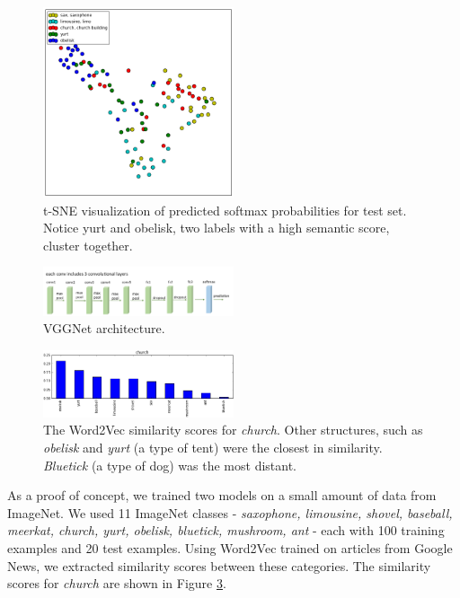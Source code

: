 \begin{figure}[!tb]
  \centering
  \includegraphics[width=0.5\textwidth]{figs/tsne.png}
  \caption{
      t-SNE visualization of predicted softmax probabilities for test set.
      Notice yurt and obelisk, two labels with a high semantic score, cluster
      together.
  }
  \label{fig:tsne}
\end{figure}

\begin{figure}[!tb]
  \centering
  \includegraphics[width=0.5\textwidth]{figs/vgg16arch.png}
  \caption{
      VGGNet architecture.
  }
  \label{fig:word2vec_similarities}
\end{figure}

\begin{figure}[!tb]
  \centering
  \includegraphics[width=0.5\textwidth]{figs/word2vec_church.png}
  \caption{
    The Word2Vec similarity scores for \emph{church}. Other structures, such as
    \emph{obelisk} and \emph{yurt} (a type of tent) were the closest in
    similarity. \emph{Bluetick} (a type of dog) was the most distant.
  }
  \label{fig:word2vec_similarities}
\end{figure}

As a proof of concept, we trained two models on a small amount of data from
ImageNet. We used 11 ImageNet classes -
\emph{
  saxophone,
  limousine,
  shovel,
  baseball,
  meerkat,
  church,
  yurt,
  obelisk,
  bluetick,
  mushroom,
  ant
} -
each with 100 training examples and 20 test examples.
Using Word2Vec trained on articles from Google News, we extracted similarity
scores between these categories. The similarity scores for \emph{church} are
shown in Figure \ref{fig:word2vec_similarities}.

